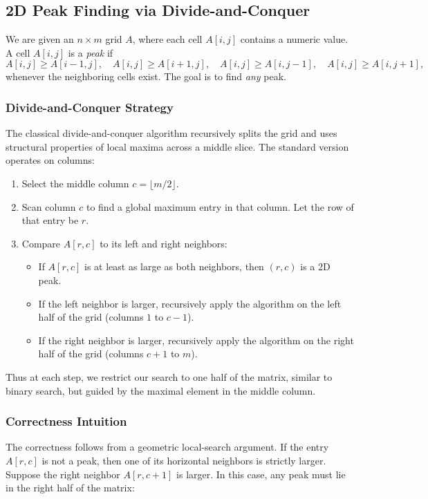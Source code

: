 \documentclass[9pt]{extarticle}
\begin{document}
\subsection{2D Peak Finding via Divide-and-Conquer}

We are given an \(n \times m\) grid \(A\), where each cell \(A[i,j]\) contains a
numeric value. A cell \(A[i,j]\) is a \emph{peak} if
\[
A[i,j] \ge A[i-1,j],\quad
A[i,j] \ge A[i+1,j],\quad
A[i,j] \ge A[i,j-1],\quad
A[i,j] \ge A[i,j+1],
\]
whenever the neighboring cells exist. The goal is to find \emph{any} peak.

\subsubsection*{Divide-and-Conquer Strategy}
The classical divide-and-conquer algorithm recursively splits the grid and
uses structural properties of local maxima across a middle slice. The standard
version operates on columns:

\begin{enumerate}
    \item Select the middle column \(c = \lfloor m/2 \rfloor\).
    \item Scan column \(c\) to find a global maximum entry in that column.
          Let the row of that entry be \(r\).
    \item Compare \(A[r,c]\) to its left and right neighbors:
          \begin{itemize}
              \item If \(A[r,c]\) is at least as large as both neighbors,
                    then \((r,c)\) is a 2D peak.
              \item If the left neighbor is larger, recursively apply the
                    algorithm on the left half of the grid
                    (columns \(1\) to \(c-1\)).
              \item If the right neighbor is larger, recursively apply the
                    algorithm on the right half of the grid
                    (columns \(c+1\) to \(m\)).
          \end{itemize}
\end{enumerate}

Thus at each step, we restrict our search to one half of the matrix, similar
to binary search, but guided by the maximal element in the middle column.

\subsubsection*{Correctness Intuition}
The correctness follows from a geometric local-search argument. If the entry
\(A[r,c]\) is not a peak, then one of its horizontal neighbors is strictly
larger. Suppose the right neighbor \(A[r,c+1]\) is larger. In this case, any
peak must lie in the right half of the matrix:
\end{document}
